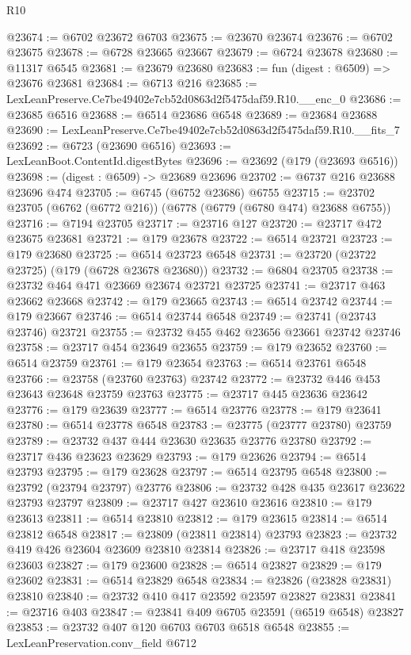 \begin{lexlean}{R10}
\begin{coremodule}
@23674 := @6702 @23672 @6703
@23675 := @23670 @23674
@23676 := @6702 @23675
@23678 := @6728 @23665 @23667
@23679 := @6724 @23678
@23680 := @11317 @6545
@23681 := @23679 @23680
@23683 := fun (digest : @6509) => @23676 @23681
@23684 := @6713 @216
@23685 := LexLeanPreserve.Ce7be49402e7cb52d0863d2f5475daf59.R10.__enc_0
@23686 := @23685 @6516
@23688 := @6514 @23686 @6548
@23689 := @23684 @23688
@23690 := LexLeanPreserve.Ce7be49402e7cb52d0863d2f5475daf59.R10.__fits_7
@23692 := @6723 (@23690 @6516)
@23693 := LexLeanBoot.ContentId.digestBytes
@23696 := @23692 (@179 (@23693 @6516))
@23698 := (digest : @6509) -> @23689 @23696
@23702 := @6737 @216 @23688 @23696 @474
@23705 := @6745 (@6752 @23686) @6755
@23715 := @23702 @23705 (@6762 (@6772 @216)) (@6778 (@6779 (@6780 @474) @23688 @6755))
@23716 := @7194 @23705
@23717 := @23716 @127
@23720 := @23717 @472 @23675 @23681
@23721 := @179 @23678
@23722 := @6514 @23721
@23723 := @179 @23680
@23725 := @6514 @23723 @6548
@23731 := @23720 (@23722 @23725) (@179 (@6728 @23678 @23680))
@23732 := @6804 @23705
@23738 := @23732 @464 @471 @23669 @23674 @23721 @23725
@23741 := @23717 @463 @23662 @23668
@23742 := @179 @23665
@23743 := @6514 @23742
@23744 := @179 @23667
@23746 := @6514 @23744 @6548
@23749 := @23741 (@23743 @23746) @23721
@23755 := @23732 @455 @462 @23656 @23661 @23742 @23746
@23758 := @23717 @454 @23649 @23655
@23759 := @179 @23652
@23760 := @6514 @23759
@23761 := @179 @23654
@23763 := @6514 @23761 @6548
@23766 := @23758 (@23760 @23763) @23742
@23772 := @23732 @446 @453 @23643 @23648 @23759 @23763
@23775 := @23717 @445 @23636 @23642
@23776 := @179 @23639
@23777 := @6514 @23776
@23778 := @179 @23641
@23780 := @6514 @23778 @6548
@23783 := @23775 (@23777 @23780) @23759
@23789 := @23732 @437 @444 @23630 @23635 @23776 @23780
@23792 := @23717 @436 @23623 @23629
@23793 := @179 @23626
@23794 := @6514 @23793
@23795 := @179 @23628
@23797 := @6514 @23795 @6548
@23800 := @23792 (@23794 @23797) @23776
@23806 := @23732 @428 @435 @23617 @23622 @23793 @23797
@23809 := @23717 @427 @23610 @23616
@23810 := @179 @23613
@23811 := @6514 @23810
@23812 := @179 @23615
@23814 := @6514 @23812 @6548
@23817 := @23809 (@23811 @23814) @23793
@23823 := @23732 @419 @426 @23604 @23609 @23810 @23814
@23826 := @23717 @418 @23598 @23603
@23827 := @179 @23600
@23828 := @6514 @23827
@23829 := @179 @23602
@23831 := @6514 @23829 @6548
@23834 := @23826 (@23828 @23831) @23810
@23840 := @23732 @410 @417 @23592 @23597 @23827 @23831
@23841 := @23716 @403
@23847 := @23841 @409 @6705 @23591 (@6519 @6548) @23827
@23853 := @23732 @407 @120 @6703 @6703 @6518 @6548
@23855 := LexLeanPreservation.conv_field @6712

\end{coremodule}
\end{lexlean}
